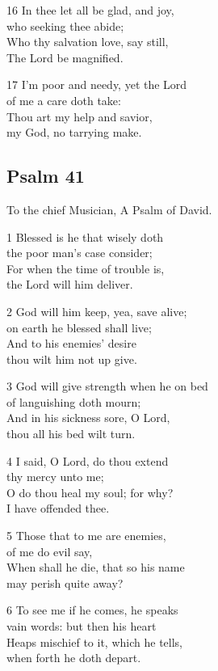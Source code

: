 \begin{multicols}{3}
16 In thee let all be glad, and joy,\\
who seeking thee abide;\\
Who thy salvation love, say still,\\
The Lord be magnified.

17 I’m poor and needy, yet the Lord\\
of me a care doth take:\\
Thou art my help and savior,\\
my God, no tarrying make.

\begin{center}
\quad{}\quad{}
\end{center}

\subsection*{Psalm 41}

To the chief Musician,
A Psalm of David.

1 Blessed is he that wisely doth\\
the poor man’s case consider;\\
For when the time of trouble is,\\
the Lord will him deliver.

2 God will him keep, yea, save alive;\\
on earth he blessed shall live;\\
And to his enemies’ desire\\
thou wilt him not up give.

3 God will give strength when he on bed\\
of languishing doth mourn;\\
And in his sickness sore, O Lord,\\
thou all his bed wilt turn.

4 I said, O Lord, do thou extend\\
thy mercy unto me;\\
O do thou heal my soul; for why?\\
I have offended thee.

5 Those that to me are enemies,\\
of me do evil say,\\
When shall he die, that so his name\\
may perish quite away?

6 To see me if he comes, he speaks\\
vain words: but then his heart\\
Heaps mischief to it, which he tells,\\
when forth he doth depart.


\end{multicols}
